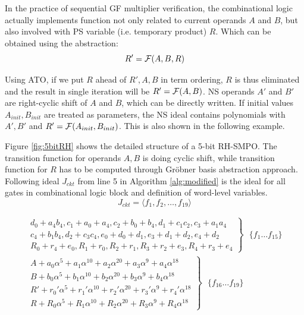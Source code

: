 In the practice of sequential GF multiplier verification, the combinational 
logic actually implements function not only related to current operands $A$ and $B$,
but also involved with PS variable (i.e. temporary product) $R$. Which can be 
obtained using the abstraction:
$$R' = {\mathcal{F}}(A,B,R)$$

Using ATO, if we put $R$ ahead of $R',A,B$ in term ordering, $R$ is thus eliminated
and the result in single iteration will be $R' = {\mathcal{F}}(A,B)$. NS operands 
$A'$ and $B'$ are right-cyclic shift of $A$ and $B$, which can be directly written.
If initial values $A_{init}, B_{init}$ are treated as parameters, the NS ideal 
contains polynomials with $A', B'$ and $R' = {\mathcal{F}}(A_{init},B_{init})$. This 
is also shown in the following example.


\begin{Example}
\label{ex:RHSMPO}
Figure \ref{fig:5bitRH} shows the detailed structure of a 5-bit RH-SMPO. The transition function for
operands $A,B$ is doing cyclic shift, while transition function for $R$ has to be computed through Gr\"obner basis
abstraction approach. Following ideal $J_{ckt}$ from line 5 in Algorithm \ref{alg:modified} is the ideal for 
all gates in combinational logic block and definition of word-level variables.
$$J_{ckt} = \langle f_1,f_2,\dots,f_{19}\rangle$$

\begin{eqnarray*}
 \left. 
\begin{aligned}
d_0+a_4b_4, c_1+a_0+a_4, c_2+b_0+b_4, d_1+c_1c_2, c_3+a_1a_4\\
c_4+b_1b_4, d_2+c_3c_4, e_0+d_0+d_1, e_3+d_1+d_2, e_4+d_2 \\
R_0+r_4+e_0, R_1+r_0, R_2+r_1, R_3+r_2+e_3, R_4+r_3+e_4
\end{aligned}\right\} ~~~\{f_1\dots f_{15}\}\\
 \left.
\begin{aligned}
 A+a_0\alpha^5+a_1\alpha^{10}+a_2\alpha^{20}+a_3\alpha^9+a_4\alpha^{18}\\
		  B+b_0\alpha^5+b_1\alpha^{10}+b_2\alpha^{20}+b_3\alpha^9+b_4\alpha^{18}\\
		  R'+r_0'\alpha^5+r_1'\alpha^{10}+r_2'\alpha^{20}+r_3'\alpha^9+r_4'\alpha^{18}\\
		  R+R_0\alpha^5+R_1\alpha^{10}+R_2\alpha^{20}+R_3\alpha^9+R_4\alpha^{18}
		 \end{aligned}\right\} ~~~\{f_{16}\dots f_{19}\}
\end{eqnarray*}


\end{Example}
